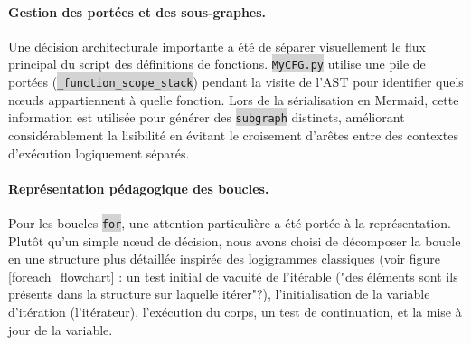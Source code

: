 \documentclass[11pt,a4paper]{article}
\newcommand{\code}[1]{\colorbox{lightgray}{\texttt{\small #1}}}
\begin{document}
\paragraph{Gestion des portées et des sous-graphes.} Une décision architecturale importante a été de séparer visuellement le flux principal du script des définitions de fonctions. \code{MyCFG.py} utilise une pile de portées (\code{\_function\_scope\_stack}) pendant la visite de l'AST pour identifier quels nœuds appartiennent à quelle fonction. Lors de la sérialisation en Mermaid, cette information est utilisée pour générer des \code{subgraph} distincts, améliorant considérablement la lisibilité en évitant le croisement d'arêtes entre des contextes d'exécution logiquement séparés.

\paragraph{Représentation pédagogique des boucles.} Pour les boucles \code{for}, une attention particulière a été portée à la représentation. Plutôt qu'un simple nœud de décision, nous avons choisi de décomposer la boucle en une structure plus détaillée inspirée des logigrammes classiques (voir figure \ref{foreach_flowchart} : un test initial de vacuité de l'itérable ("des éléments sont ils présents dans la structure sur laquelle itérer"?), l'initialisation de la variable d'itération (l'itérateur), l'exécution du corps, un test de continuation, et la mise à jour de la variable. 
\end{document}
